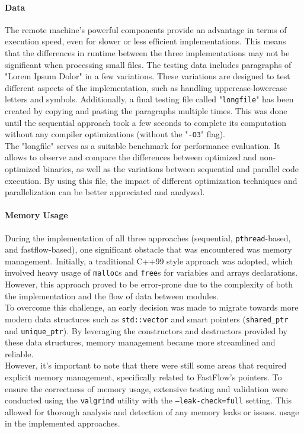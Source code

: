 \documentclass[10pt]{article}
\begin{document}
\paragraph{Data} The remote machine's powerful components provide an advantage in terms of execution speed, even for slower or less efficient implementations. This means that the differences in runtime between the three implementations may not be significant when processing small files. The testing data includes paragraphs of "Lorem Ipsum Dolor" in a few variations. These variations are designed to test different aspects of the implementation, such as handling uppercase-lowercase letters and symbols. Additionally, a final testing file called "\texttt{longfile}" has been created by copying and pasting the paragraphs multiple times. This was done until the sequential approach took a few seconds to complete its computation without any compiler optimizations (without the "\texttt{-O3}" flag).\\
The "longfile" serves as a suitable benchmark for performance evaluation. It allows to observe and compare the differences between optimized and non-optimized binaries, as well as the variations between sequential and parallel code execution. By using this file, the impact of different optimization techniques and parallelization can be better appreciated and analyzed.
\paragraph{Memory Usage} During the implementation of all three approaches (sequential, \texttt{pthread}-based, and fastflow-based), one significant obstacle that was encountered was memory management. Initially, a traditional C++99 style approach was adopted, which involved heavy usage of \texttt{malloc}s and \texttt{free}s for variables and arrays declarations. However, this approach proved to be error-prone due to the complexity of both the implementation and the flow of data between modules.\\
To overcome this challenge, an early decision was made to migrate towards more modern data structures such as \texttt{std::vector} and smart pointers (\texttt{shared\_ptr} and \texttt{unique\_ptr}). By leveraging the constructors and destructors provided by these data structures, memory management became more streamlined and reliable.\\
However, it's important to note that there were still some areas that required explicit memory management, specifically related to FastFlow's pointers. To ensure the correctness of memory usage, extensive testing and validation were conducted using the \texttt{valgrind} utility with the \texttt{--leak-check=full} setting. This allowed for thorough analysis and detection of any memory leaks or issues. usage in the implemented approaches.
\end{document}
